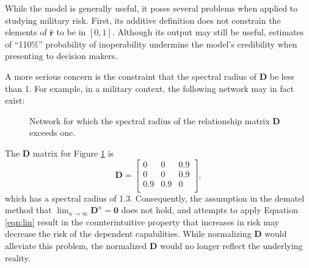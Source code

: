 \documentclass{article}
\begin{document}
While the \citeauthor{haimes-iiom} model is generally useful, it poses several problems when applied to studying military risk. First, its additive definition does not constrain the elements of $\hat{\mathbf{r}}$ to be in $[0,1]$. Although its output may still be useful, estimates of ``110\%'' probability of inoperability undermine the model's credibility when presenting to decision makers. 

A more serious concern is the constraint that the spectral radius of $\mathbf{D}$ be less than 1. For example, in a military context, the following network may in fact exist:

\begin{figure}[!htb]
\centering
{}
\caption{Network for which the spectral radius of the relationship matrix $\mathbf{D}$ exceeds one.}
\label{fig:ovary}
\end{figure}
The $\mathbf{D}$ matrix for Figure \ref{fig:ovary} is 
\begin{equation*}
\mathbf{D} = 
\begin{bmatrix}
0 & 0 & 0.9 \\
0 & 0 & 0.9 \\
0.9 & 0.9 & 0\\
\end{bmatrix},
\end{equation*}
which has a spectral radius of 1.3. Consequently, the assumption in the \ac{dematel} method that $\lim_{n\rightarrow \infty} \mathbf{D}^n = \mathbf{0}$ does not hold, and attempts to apply Equation \ref{eqn:lin} result in the counterintuitive property that increases in risk may decrease the risk of the dependent capabilities. While normalizing $\mathbf{D}$ would alleviate this problem, the normalized $\mathbf{D}$ would no longer reflect the underlying reality. 
\end{document}
